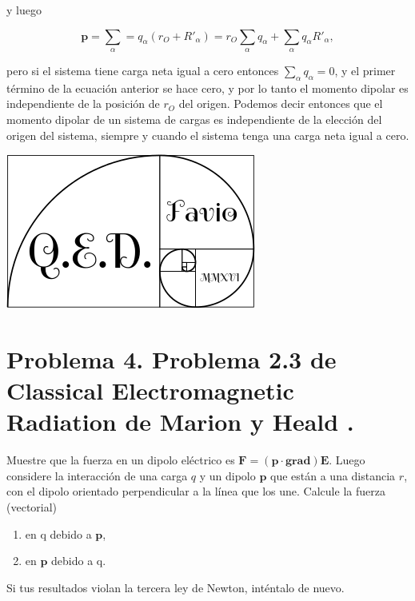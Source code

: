 \documentclass[a4paper,11pt]{article}
\numberwithin{equation}{section}
\begin{document}
y luego 

\begin{equation}
 \mathbf{p} = \sum_\alpha = q_\alpha(r_O + R'_\alpha) = r_O \sum_\alpha q_\alpha + 
 \sum_\alpha q_\alpha R'_\alpha,
\end{equation}

pero si el sistema tiene carga neta igual a cero entonces $\sum_\alpha q_\alpha = 0$, y 
el primer término de la ecuación anterior se hace cero, y por lo tanto el momento 
dipolar es independiente de la posición de $r_O$ del origen. Podemos decir 
entonces que el momento dipolar de un sistema de cargas es independiente de la elección
del origen del sistema, siempre y cuando el sistema tenga una carga neta igual a 
cero.

\hspace{10cm}\includegraphics[scale=0.25]{logoQED}

\newpage

\section{Problema 4. Problema 2.3 de Classical Electromagnetic Radiation
de Marion y Heald \cite{marion2}.}

Muestre que la fuerza en un dipolo eléctrico es $\mathbf{F} = (\mathbf{p}\cdot 
\mathbf{grad})\mathbf{E}$. Luego considere la interacción de una carga $q$ y un dipolo 
$\mathbf{p}$ que están a una distancia $r$, con el dipolo orientado perpendicular a 
la línea que los une. Calcule la fuerza (vectorial)

\begin{enumerate}[label=\textbf{(\alph*)}]
\item en q debido a $\mathbf{p}$, 
\item en $\mathbf{p}$ debido a q.
\end{enumerate}

Si tus resultados violan la tercera ley de Newton, inténtalo de nuevo.

\vspace{.3cm}
\end{document}
